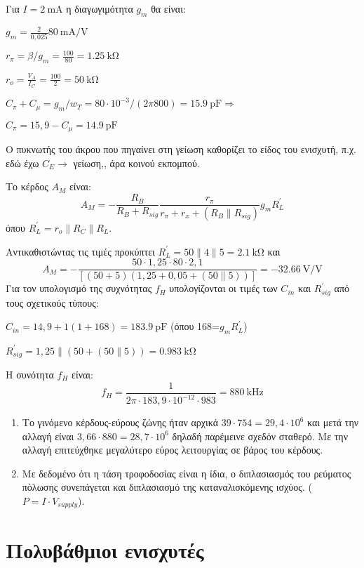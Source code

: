 \documentclass[11pt,a4paper,titlepage,fleqn]{article}
\begin{document}
Για $I=\SI{2}{\milli\ampere}$ η διαγωγιμότητα $g_m$ θα είναι:

$g_m =\frac{2}{0,025} \SI[per-mode=symbol]{80}{\milli\ampere\per\volt} $

$r_\pi = \beta / g_m =  \frac{100}{80} = \SI{1,25}{\kilo\ohm}$

$r_o = \frac{V_A}{I_C}= \frac{100}{2} = \SI{50}{\kilo\ohm}$

$C_\pi + C_\mu = g_m/w_T  = 80\cdot10^{-3} / (2\pi800) = \SI{15,9}{\pico\farad} \Rightarrow$

$C_\pi=15,9-C_\mu= \SI{14,9}{\pico\farad}$

Ο πυκνωτής του άκρου που πηγαίνει στη γείωση καθορίζει το είδος του ενισχυτή, π.χ. εδώ έχω $C_E \rightarrow$ γείωση,, άρα κοινού εκπομπού.

Το κέρδος $A_M$ είναι:
\[A_M= - \frac{R_B}{R_B+R_{sig}} \frac{r_\pi}{r_\pi + r_x + (R_B\| R_{sig})} g_mR^{'}_L\]
όπου $R^{'}_L= r_o\| R_C\|R_L$.

Αντικαθιστώντας τις τιμές προκύπτει $R^{'}_L = 50\|4\|5 = \SI{2,1}{\kilo\ohm}$ και
\[A_M = - \frac{50 \cdot1,25\cdot80\cdot2,1}{\left[(50+5)(1,25+0,05+ (50\|5))\right]} = -  \SI[per-mode=symbol]{32,66}{\volt\per\volt} 
\]
Για τον υπολογισμό της συχνότητας $f_H$ υπολογίζονται οι τιμές των $C_{in} $ και $R^{'}_{sig}$ από τους σχετικούς τύπους: 

$C_{in} = 14,9 +1(1+168) = \SI{183,9}{\pico\farad}$
   (όπου 168=$g_mR^{'}_L$) 
 
 $R^{'}_{sig} = 1,25 \| \left(50+(50\|5)\right) =  \SI{0,983}{\kilo\ohm}$
 
 Η συνότητα $f_H$ είναι: \[
 f_H = \frac{1}{2\pi \cdot 183,9 \cdot 10^{-12} \cdot 983} = \SI{880}{\kilo\hertz}
 \]
 \begin{enumerate}[label=\noanw\alph*.]
 	\item 
 	Το γινόμενο κέρδους-εύρους ζώνης ήταν αρχικά $39\cdot754 = 29,4\cdot10^6$  και μετά την αλλαγή είναι $3,66\cdot 880=28,7\cdot10^6$ δηλαδή παρέμεινε σχεδόν σταθερό. Με την αλλαγή επιτεύχθηκε μεγαλύτερο εύρος λειτουργίας σε βάρος του κέρδους.
 	\item
 	Με δεδομένο ότι η τάση τροφοδοσίας είναι η ίδια, ο διπλασιασμός του ρεύματος πόλωσης συνεπάγεται και διπλασιασμό της καταναλισκόμενης ισχύος. ($P=I\cdot V_{supply}$).
 \end{enumerate}



\section{Πολυβάθμιοι ενισχυτές}
\end{document}

